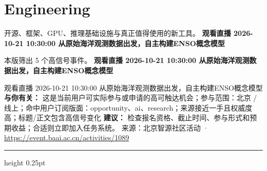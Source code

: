 \documentclass[10.5pt]{ctexart}
\begin{document}
\section*{Engineering}
{\color{ormuted} 开源、框架、GPU、推理基础设施与真正值得使用的新工具。}
\vspace{2mm}
{\LARGE\bfseries 观看直播 2026-10-21 10:30:00 从原始海‮观洋‬测数据出发，自主构建ENSO概念模型}\par
\vspace{1mm}
{\color{ormuted} 本版筛出 5 个高信号事件。}
\vspace{3mm}
{\Large\bfseries 观看直播 2026-10-21 10:30:00 从原始海‮观洋‬测数据出发，自主构建ENSO概念模型}\par
观看直播 2026-10-21 10:30:00 从原始海‮观洋‬测数据出发，自主构建ENSO概念模型
\textbf{与你有关：} 这是当前用户可实际参与或申请的高可触达机会；参与范围：北京 / 线上；命中用户订阅版面：opportunity、ai、research；来源接近一手且权威度高；标题/正文包含高信号变化
\textbf{建议：} 检查报名资格、截止时间、参与形式和预期收益；合适则立即加入任务系统。
{\footnotesize\color{ormuted} 来源：北京智源社区活动 · \url{https://event.baai.ac.cn/activities/1089}}
\vspace{4mm}
\hrule height 0.25pt
\vspace{3mm}
\end{document}
